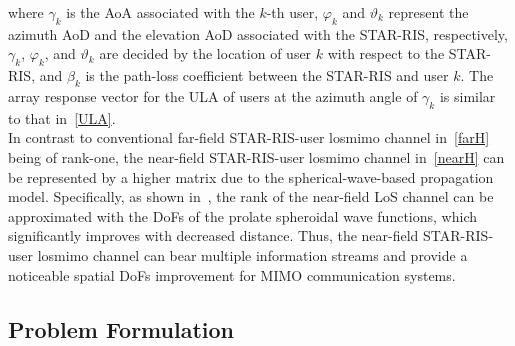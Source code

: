 \documentclass[12pt, draftclsnofoot, onecolumn]{IEEEtran}
\newcommand{\mimo}{\gls{mimo}\xspace}
\newcommand{\los}{\gls{los}\xspace}
\begin{document}
\noindent where $\gamma_{k}$ is the AoA associated with the $k$-th user, $\varphi_{k}$ and $\vartheta_{k}$ represent the azimuth AoD and the elevation AoD associated with the STAR-RIS, respectively, $\gamma_{k}$, $\varphi_{k}$, and $\vartheta_{k}$ are decided by the location of user $k$ with respect to the STAR-RIS, and $\beta_k$ is the path-loss coefficient between the STAR-RIS and user $k$. The array response vector for the ULA of users at the azimuth angle of $\gamma_k$ is similar to that in~\eqref{ULA}.\\
\indent In contrast to conventional far-field STAR-RIS-user \los \mimo channel in~\eqref{farH} being of rank-one, the near-field STAR-RIS-user \los \mimo channel in~\eqref{nearH} can be represented by a higher matrix due to the spherical-wave-based propagation model. {Specifically, as shown in~\cite{miller2000communicating}, the rank of the near-field LoS channel can be approximated with the DoFs of the prolate spheroidal wave functions, which significantly improves with decreased distance.} Thus, the near-field STAR-RIS-user \los \mimo channel can bear multiple information streams and provide a noticeable spatial DoFs improvement for MIMO communication systems.
\subsection{Problem Formulation}
\end{document}
